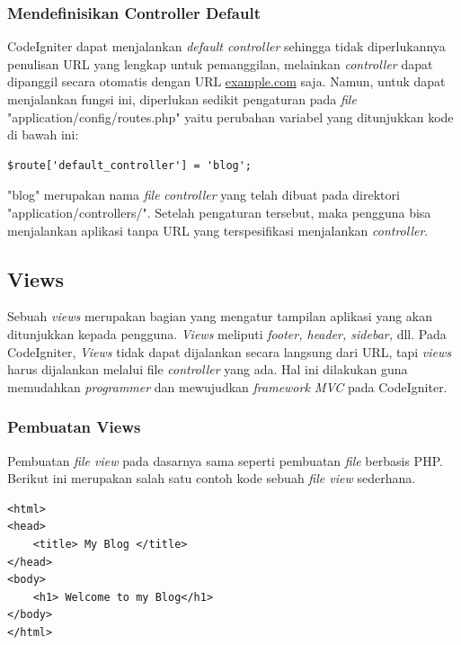 \subsubsection{Mendefinisikan Controller Default}
\label{subsub: defaulController}

	CodeIgniter dapat menjalankan \textit{default controller} sehingga tidak diperlukannya penulisan URL yang lengkap untuk pemanggilan, melainkan \textit{controller} dapat dipanggil secara otomatis dengan URL \url{example.com} saja. Namun, untuk dapat menjalankan fungsi ini, diperlukan sedikit pengaturan pada \textit{file} "application/config/routes.php" yaitu perubahan variabel yang ditunjukkan kode di bawah ini:
	
	\begin{lstlisting}[caption= Default Controller]
	$route['default_controller'] = 'blog';
	\end{lstlisting}
	
	"blog" merupakan nama \textit{file} \textit{controller} yang telah dibuat pada direktori "application/controllers/". Setelah pengaturan tersebut, maka pengguna bisa menjalankan aplikasi tanpa URL yang terspesifikasi menjalankan \textit{controller}.
	
	\subsection{Views}
	\label{sub: views}
	
	Sebuah \textit{views} merupakan bagian yang mengatur tampilan aplikasi yang akan ditunjukkan kepada pengguna. \textit{Views} meliputi \textit{footer, header, sidebar,} dll.
	Pada CodeIgniter, \textit{Views} tidak dapat dijalankan secara langsung dari URL, tapi \textit{views} harus dijalankan melalui file \textit{controller} yang ada. Hal ini dilakukan guna memudahkan \textit{programmer} dan mewujudkan \textit{framework MVC} pada CodeIgniter.
	
	\subsubsection{Pembuatan Views}
	\label{subsub: pembuatanView}
	
	Pembuatan \textit{file view} pada dasarnya sama seperti pembuatan \textit{file} berbasis PHP. Berikut ini merupakan salah satu contoh kode sebuah \textit{file view} sederhana.
	
	\begin{lstlisting}[caption={File View}, label={fileView}]
<html>
<head>
	<title> My Blog </title>
</head>
<body>
	<h1> Welcome to my Blog</h1>
</body>
</html>
	\end{lstlisting}
	
